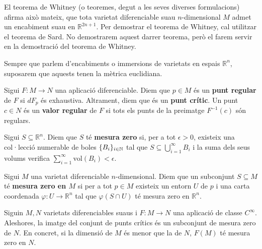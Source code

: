 El teorema de Whitney (o teoremes, degut a les seves diverses formulacions) afirma això mateix, que tota varietat diferenciable suau $n$-dimensional $M$ admet un encabiment suau en $\mathbb R^{2n+1}$. Per demostrar el teorema de Whitney, cal utilitzar el teorema de Sard. No demostrarem aquest darrer teorema, però el farem servir en la demostració del teorema de Whitney.
\begin{nota}
    Sempre que parlem d'encabiments o immersions de varietats en espais $\mathbb R^n$, suposarem que aquests tenen la mètrica euclidiana.
\end{nota}
\begin{defi}
    Sigui $F:M\to N$ una aplicació diferenciable. Diem que $p\in M$ és un \textbf{punt regular} de $F$ si $dF_p$ és exhaustiva. Altrament, diem que és un \textbf{punt crític}. Un punt $c\in N$ és un \textbf{valor regular} de $F$ si tots els punts de la preimatge $F^{-1}(c)$ són regulars.
\end{defi}

\begin{defi}
    Sigui $S\subseteq\mathbb R^n$. Diem que $S$ té \textbf{mesura zero} si, per a tot $\epsilon>0$, existeix una col·lecció numerable de boles $\{B_i\}_{i\in\mathbb N}$ tal que $S \subseteq \bigcup_{i=1}^\infty B_i$ i la suma dels seus volums verifica $\sum_{i=1}^\infty \text{vol}(B_i) < \epsilon$.

    Sigui $M$ una varietat diferenciable $n$-dimensional. Diem que un subconjunt $S\subseteq M$ té \textbf{mesura zero en $M$} si per a tot $p\in M$ existeix un entorn $U$ de $p$ i una carta coordenada $\varphi:U\to\mathbb R^n$ tal que $\varphi(S\cap U)$ té mesura zero en $\mathbb R^n$.
\end{defi}

\begin{teo}
    Siguin $M, N$ varietats diferenciables suaus i $F:M\to N$ una aplicació de classe $C^\infty$. Aleshores, la imatge del conjunt de punts crítics és un subconjunt de mesura zero de $N$. En concret, si la dimensió de $M$ és menor que la de $N$, $F(M)$ té mesura zero en $N$.
\end{teo}

